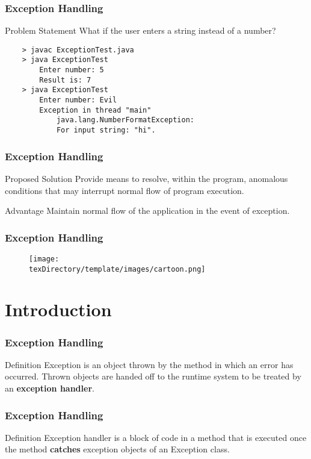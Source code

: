 \documentclass[10pt, compress]{beamer}
\begin{document}
\begin{frame}[fragile]
	\frametitle{Exception Handling}
	\begin{block}{Problem Statement}
		What if the user enters a string instead of a number?
\begin{verbatim}
	> javac ExceptionTest.java
	> java ExceptionTest
		Enter number: 5
		Result is: 7
	> java ExceptionTest
		Enter number: Evil
		Exception in thread "main"
			java.lang.NumberFormatException:
			For input string: "hi".
\end{verbatim}
	\end{block}
\end{frame}

\begin{frame}[fragile]
	\frametitle{Exception Handling}
	\begin{block}{Proposed Solution}
		Provide means to resolve, within the program, anomalous conditions that may interrupt normal flow of program execution.
	\end{block}
	\begin{block}{Advantage}
		Maintain normal flow of the application in the event of exception.
	\end{block}
\end{frame}

\begin{frame}[fragile]
	\frametitle{Exception Handling}
	\begin{figure}
		\texttt{[image: \\texDirectory/template/images/cartoon.png]}
	\end{figure}
\end{frame}

\section{Introduction}

\begin{frame}[fragile]
	\frametitle{Exception Handling}
	\begin{block}{Definition}
		Exception is an object thrown by the method in which an error has occurred. Thrown objects are handed off to the runtime system to be treated by an \textbf{exception handler}.
	\end{block}
\end{frame}

\begin{frame}[fragile]
	\frametitle{Exception Handling}
	\begin{block}{Definition}
		Exception handler is a block of code in a method that is executed once the method \textbf{catches} exception objects of an Exception class.
	\end{block}
\end{frame}
\end{document}
